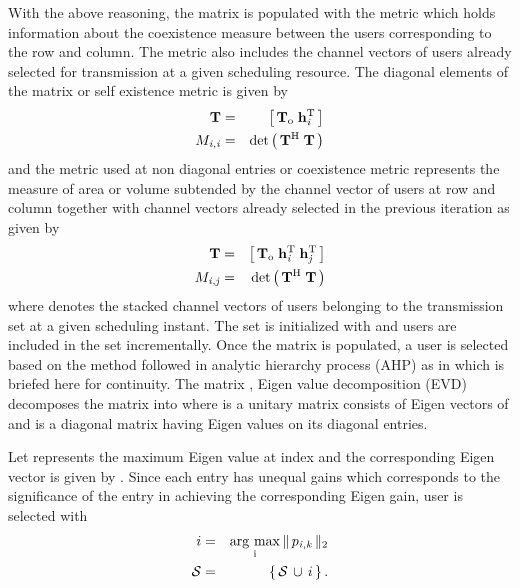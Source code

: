 With the above reasoning, the matrix  is populated with the metric which holds information about the coexistence measure between the users corresponding to the  row and  column. The metric also includes the channel vectors of users already selected for transmission at a given scheduling resource. The diagonal elements of the matrix  or self existence metric is given by
\begin{eqnarray}
\mathbf{T} &=& \left [\,\mathbf{T}_{\mathrm{o}} \; \mathbf{h}_{\mathit{i}}^{\mathrm{T}} \, \right ] \\
{M}_{\mathit{i},\mathit{i}} &=& \det{\left ( \, \mathbf{T}^{\mathrm{H}} \; \mathbf{T} \, \right )} \label{mca1-e1:1}
\label{mca1-e1}
\end{eqnarray}
and the metric used at non diagonal entries or coexistence metric represents the measure of area or volume subtended by the channel vector of users at  row and  column together with channel vectors already selected in the previous iteration as given by
\begin{eqnarray}
\mathbf{T} &=& \left [\,\mathbf{T}_{\mathrm{o}} \; \mathbf{h}_{\mathit{i}}^{\mathrm{T}} \; \mathbf{h}_{\mathit{j}}^{\mathrm{T}} \, \right ] \\
{M}_{\mathit{i},\mathit{j}} &=& \det{\left ( \, \mathbf{T}^{\mathrm{H}} \; \mathbf{T} \, \right )} \label{mca1-e2:1}
\label{mca1-e2}
\end{eqnarray}
where  denotes the stacked channel vectors of users belonging to the transmission set  at a given scheduling instant. The set  is initialized with \me{\emptyset} and users are included in the set incrementally. Once the matrix  is populated, a user is selected based on the method followed in analytic hierarchy process (AHP) as in \cite{saaty2008decision} which is briefed here for continuity. The matrix , Eigen value decomposition (EVD) decomposes the matrix into  where  is a unitary matrix consists of Eigen vectors of  and  is a diagonal matrix having Eigen values on its diagonal entries.

Let  represents the maximum Eigen value at  index and the corresponding Eigen vector is given by . Since each entry  has unequal gains which corresponds to the significance of the entry in achieving the corresponding Eigen gain, user  is selected with
\begin{eqnarray}
i &=& \operatorname*{\arg\,max}_{\mathrm{i}} \|\, {p}_{\mathit{i},\mathit{k}} \,\|_{2} \label{mca1-e3:1} \\
\mathcal{S} &=& \left \lbrace \, \mathcal{S} \, \cup \, i \, \right \rbrace.
\label{mca1-e3}
\end{eqnarray}

